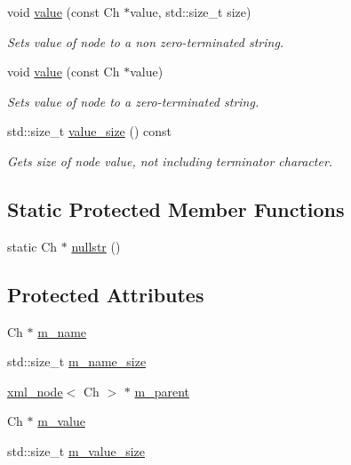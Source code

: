 \begin{DoxyCompactItemize}
void \mbox{\hyperlink{classrapidxml_1_1xml__base_ad9640aa3f5374673cb72a5289b6c91eb}{value}} (const Ch $\ast$value, std\+::size\+\_\+t size)
\begin{DoxyCompactList}\small\item\em Sets value of node to a non zero-\/terminated string. \end{DoxyCompactList}\item 
void \mbox{\hyperlink{classrapidxml_1_1xml__base_a18c7469acdca771de9b4f3054053029c}{value}} (const Ch $\ast$value)
\begin{DoxyCompactList}\small\item\em Sets value of node to a zero-\/terminated string. \end{DoxyCompactList}\item 
std\+::size\+\_\+t \mbox{\hyperlink{classrapidxml_1_1xml__base_aa6981b3244607ea4ae7634f74f25361b}{value\+\_\+size}} () const
\begin{DoxyCompactList}\small\item\em Gets size of node value, not including terminator character. \end{DoxyCompactList}\end{DoxyCompactItemize}
\subsection*{Static Protected Member Functions}
\begin{DoxyCompactItemize}
\item 
static Ch $\ast$ \mbox{\hyperlink{classrapidxml_1_1xml__base_a641d0b8df8e0c3c7e0db06ced0e0749f}{nullstr}} ()
\end{DoxyCompactItemize}
\subsection*{Protected Attributes}
\begin{DoxyCompactItemize}
\item 
Ch $\ast$ \mbox{\hyperlink{classrapidxml_1_1xml__base_a23053aafada985ece680d52694c63cdc}{m\+\_\+name}}
\item 
std\+::size\+\_\+t \mbox{\hyperlink{classrapidxml_1_1xml__base_af67d7df13abd2eb30036a801b87d6f81}{m\+\_\+name\+\_\+size}}
\item 
\mbox{\hyperlink{classrapidxml_1_1xml__node}{xml\+\_\+node}}$<$ Ch $>$ $\ast$ \mbox{\hyperlink{classrapidxml_1_1xml__base_a1b2fdbb90cc0cc9135a8311c40d79bf9}{m\+\_\+parent}}
\item 
Ch $\ast$ \mbox{\hyperlink{classrapidxml_1_1xml__base_a8fbc9ba6b320f64f4bdab09469a9e623}{m\+\_\+value}}
\item 
std\+::size\+\_\+t \mbox{\hyperlink{classrapidxml_1_1xml__base_a643295fc68623ed58e2db3551d44fef0}{m\+\_\+value\+\_\+size}}
\end{DoxyCompactItemize}


